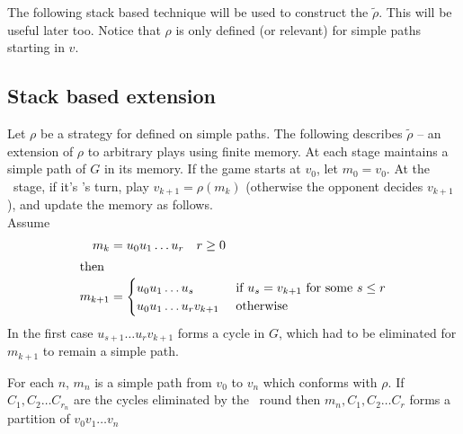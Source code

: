 The following stack based technique will be used to construct the $\tilde{\rho}$. This will be useful later too. Notice that $\rho$ is only defined (or relevant) for simple paths starting in $v$.

\subsection{Stack based extension} 
\label{sec:stack}
Let $\rho$ be a strategy for  defined on simple paths. The following describes $ \tilde{\rho}$ -- an extension of $\rho$ to arbitrary plays using finite memory. At each stage  maintains a simple path of $G$ in its memory. If the game starts at $v_0$, let $m_0=v_0$. At the \nth[k+1]\ stage, if it's 's turn, play $v_{k+1}=\rho(m_k)$ (otherwise the opponent decides $v_{k+1}$), and update the memory as follows.\\
Assume
\begin{align*}
    m_k &=u_0 u_1 \ldots u_r \quad r \geq 0\\
    \intertext{then}
    m_{k+1}&=\begin{cases}
        u_0 u_1 \ldots u_s & \text{ if } u_s = v_{k+1} \text{ for some } s \leq r \\
        u_0  u_1 \ldots u_r v_{k+1} & \text{ otherwise }
        \end{cases}
\end{align*}
In the first case $u_{s+1} \ldots u_r v_{k+1}$ forms a cycle in $G$, which had to be eliminated for $m_{k+1}$ to remain a simple path.

For each $n$, $m_n$ is a simple path from $v_0$ to $v_n$ which conforms with $\rho$. If $C_1,C_2 \ldots C_{r_n}$ are the cycles eliminated by the \nth\ round then $m_n, C_1, C_2 \ldots C_r$ forms a partition of $v_0v_1 \ldots v_n$


